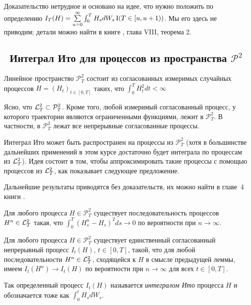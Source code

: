 Доказательство нетрудное и основано на идее, что нужно положить по определению $I_T(H) = \sum\limits_{u=0}^\infty \int_0^T H_s d W_s \operatorname{I}(T \in [u, u+1))$.
Мы его здесь не приводим; детали можно найти в книге \cite{BulinskiShiryaev04}, глава VIII, теорема 2.


\subsection{\difficult\ Интеграл Ито для процессов из пространства \texorpdfstring{$\mathcal{P}^2$}{P2}}

\begin{definition}
Линейное пространство $\mathcal{P}^2_T$ состоит из согласованных измеримых случайных процессов $H=(H_t)_{t\in[0,T]}$ таких, что $\int_0^T H_t^2 dt < \infty$ \as
\end{definition}

Ясно, что $\mathcal{L}^2_T \subset \mathcal{P}^2_T$.
Кроме того, любой измеримый согласованный процесс, у которого траектории являются ограниченными функциями, лежит в $\mathcal{P}^2_T$.
В частности, в $\mathcal{P}^2_T$ лежат все непрерывные согласованные процессы.

Интеграл Ито может быть распространен на процессы из $\mathcal{P}^2_T$ (хотя в большинстве дальнейших применений в этом курсе достаточно будет интеграла по процессам из $\mathcal{L}^2_T$).
Идея состоит в том, чтобы аппроксимировать такие процессы с помощью процессов из $\mathcal{L}^2_T$, как показывает следующее предложение.

Дальнейшие результаты приводятся без доказательств, их можно найти в главе~4 книги \cite{LiptserShiryaev74}.


\begin{lemma}
Для любого процесса $H\in \mathcal{P}^2_T$ существует последовательность процессов $H^n \in \mathcal{L}^2_T$ такая, что $\int_0^T (H_s^n - H_s)^2 ds \to 0$ по вероятности при $n\to\infty$.
\end{lemma}

\begin{theorem}
Для любого процесса $H\in \mathcal{P}^2_T$ существует единственный согласованный непрерывный процесс $I_t(H)$, $t\in[0,T]$, такой, что для любой последовательности $H^n\in \mathcal{L}^2_T$, сходящейся к $H$ в смысле предыдущей леммы, имеем $I_t(H^n) \to I_t(H)$ по вероятности при $n\to\infty$ для всех $t\in[0,T]$.
\end{theorem}

\begin{definition}
Так определенный процесс $I_t(H)$ называется \emph{интегралом Ито} процесса $H$ и обозначается тоже как $\int_0^t H_s d W_s$.
\end{definition}

